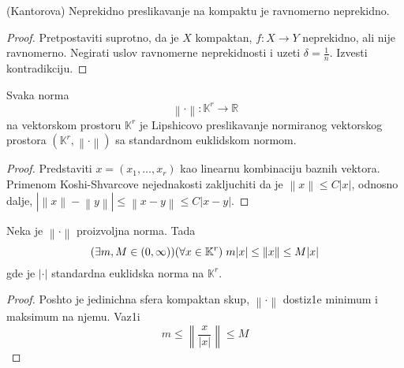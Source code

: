 \documentclass[a4paper,12pt]{article}
\newcommand{\RR}{\mathbb{R}}
\newcommand{\norm}[1]{\left\lVert#1\right\rVert}
\begin{document}
\begin{tma}
(Kantorova) Neprekidno preslikavanje na kompaktu je ravnomerno neprekidno.
\end{tma}
\begin{proof}
Pretpostaviti suprotno, da je $X$ kompaktan, $f:X \to Y$ neprekidno, ali nije ravnomerno. Negirati uslov ravnomerne neprekidnosti i uzeti $\delta = \frac{1}{n}$.  Izvesti kontradik\-ciju. 
\end{proof}

\begin{lema}
Svaka norma 
\[\norm{\cdot} : \mathbb{K}^r \to \RR \]
na vektorskom prostoru $\mathbb{K}^r$ je Lipshicovo preslikavanje normiranog vektorskog prostora $(\mathbb{K}^r, \norm{\cdot})$ sa standardnom euklidskom normom.
\end{lema}
\begin{proof}
Predstaviti $x = (x_1, \dots, x_r)$ kao linearnu kombinaciju baznih vektora. Primenom Koshi-Shvarcove nejednakosti zakljuchiti da je $\norm{x} \leq C |x|$, odnosno dalje, $|\norm{x} - \norm{y} | \leq \norm{x-y} \leq C |x-y|$.
\end{proof}

\begin{tvr}
Neka je $\norm{\cdot}$ proizvoljna norma. Tada 
\[(\exists m,M \in (0,\infty) ) (\forall x \in \mathbb{K}^r) \hspace{0.1cm} m|x| \leq \norm{x} \leq M|x| \]
gde je $|\cdot|$ standardna euklidska norma na $\mathbb{K}^r$.
\end{tvr}
\begin{proof}
Poshto je jedinichna sfera kompaktan skup, $\norm{\cdot}$ dostiz1e minimum i maksimum na njemu. Vaz1i
 \[ m \leq \norm{\frac{x}{|x|}} \leq M\]
\end{proof}
\end{document}
